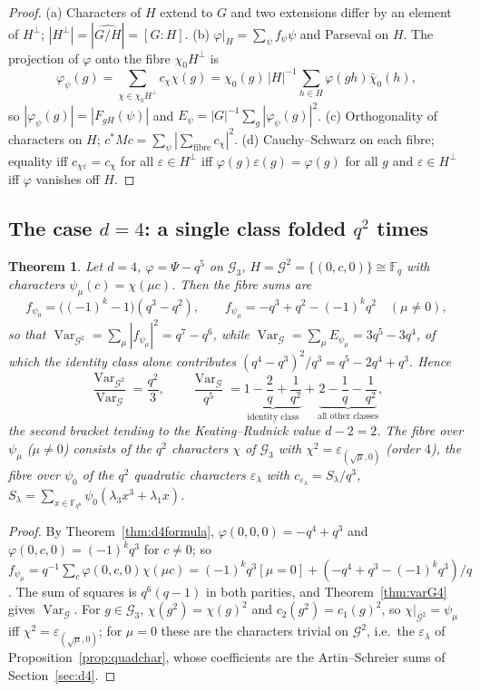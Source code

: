 \documentclass[11pt,a4paper]{amsart}
\newtheorem{theorem}{Theorem}[section]
\theoremstyle{definition}
\newcommand{\F}{\mathbb{F}}
\newcommand{\G}{\mathcal{G}}
\newcommand{\Var}{\operatorname{Var}}
\newcommand{\eps}{\varepsilon}
\begin{document}
\begin{proof}
(a) Characters of $H$ extend to $G$ and two extensions differ by an element of $H^\perp$; $|H^\perp|=|\widehat{G/H}|=[G:H]$. (b) $\varphi|_H=\sum_\psi f_\psi\psi$ and Parseval on $H$. The projection of $\varphi$ onto the fibre $\chi_0H^\perp$ is
\[
\varphi_\psi(g)=\sum_{\chi\in\chi_0H^\perp}c_\chi\chi(g)=\chi_0(g)\,|H|^{-1}\sum_{h\in H}\varphi(gh)\bar\chi_0(h),
\]
so $|\varphi_\psi(g)|=|F_{gH}(\psi)|$ and $E_\psi=|G|^{-1}\sum_g|\varphi_\psi(g)|^2$. (c) Orthogonality of characters on $H$; $c^*Mc=\sum_\psi|\sum_{\mathrm{fibre}}c_\chi|^2$. (d) Cauchy--Schwarz on each fibre; equality iff $c_{\chi\eps}=c_\chi$ for all $\eps\in H^\perp$ iff $\varphi(g)\eps(g)=\varphi(g)$ for all $g$ and $\eps\in H^\perp$ iff $\varphi$ vanishes off $H$.
\end{proof}

\subsection{The case \texorpdfstring{$d=4$}{d=4}: a single class folded \texorpdfstring{$q^2$}{q2} times}
\begin{theorem}\label{thm:folding4}
Let $d=4$, $\varphi=\Psi-q^5$ on $\G_3$, $H=\G^2=\{(0,c,0)\}\cong\F_q$ with characters $\psi_\mu(c)=\chi(\mu c)$. Then the fibre sums are
\[
f_{\psi_0}=\bigl((-1)^k-1\bigr)(q^3-q^2),\qquad f_{\psi_\mu}=-q^3+q^2-(-1)^kq^2\quad(\mu\ne0),
\]
so that $\Var_{\G^2}=\sum_\mu|f_{\psi_\mu}|^2=q^7-q^6$, while $\Var_\G=\sum_\mu E_{\psi_\mu}=3q^5-3q^4$, of which the identity class alone contributes $(q^4-q^3)^2/q^3=q^5-2q^4+q^3$. Hence
\[
\frac{\Var_{\G^2}}{\Var_\G}=\frac{q^2}3,\qquad \frac{\Var_\G}{q^5}=\underbrace{1-\frac2q+\frac1{q^2}}_{\text{identity class}}+\underbrace{2-\frac1q-\frac1{q^2}}_{\text{all other classes}},
\]
the second bracket tending to the Keating--Rudnick value $d-2=2$. The fibre over $\psi_\mu$ ($\mu\ne0$) consists of the $q^2$ characters $\chi$ of $\G_3$ with $\chi^2=\eps_{(\sqrt\mu,0)}$ (order $4$), the fibre over $\psi_0$ of the $q^2$ quadratic characters $\eps_\lambda$ with $c_{\eps_\lambda}=S_\lambda/q^3$, $S_\lambda=\sum_{x\in\F_{q^8}}\psi_0(\lambda_3x^3+\lambda_1x)$.
\end{theorem}
\begin{proof}
By Theorem~\ref{thm:d4formula}, $\varphi(0,0,0)=-q^4+q^3$ and $\varphi(0,c,0)=(-1)^kq^3$ for $c\ne0$; so $f_{\psi_\mu}=q^{-1}\sum_c\varphi(0,c,0)\chi(\mu c)=(-1)^kq^3[\mu=0]+(-q^4+q^3-(-1)^kq^3)/q$. The sum of squares is $q^6(q-1)$ in both parities, and Theorem~\ref{thm:varG4} gives $\Var_\G$. For $g\in\G_3$, $\chi(g^2)=\chi(g)^2$ and $c_2(g^2)=c_1(g)^2$, so $\chi|_{\G^2}=\psi_\mu$ iff $\chi^2=\eps_{(\sqrt\mu,0)}$; for $\mu=0$ these are the characters trivial on $\G^2$, i.e.\ the $\eps_\lambda$ of Proposition~\ref{prop:quadchar}, whose coefficients are the Artin--Schreier sums of Section~\ref{sec:d4}.
\end{proof}
\end{document}
